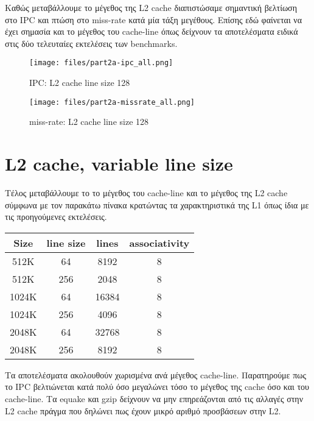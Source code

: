 \documentclass[a4paper,12pt]{article}
\begin{document}
Καθώς μεταβάλλουμε το μέγεθος της L2 cache διαπιστώσαμε σημαντική βελτίωση στο
IPC και πτώση στο miss-rate κατά μία τάξη μεγέθους. Επίσης εδώ φαίνεται να
έχει σημασία και το μέγεθος του cache-line όπως δείχνουν τα αποτελέσματα
ειδικά στις δύο τελευταίες εκτελέσεις των benchmarks.

\begin{figure}[H]
    \centering
    \texttt{[image: files/part2a-ipc\_all.png]}
    \caption{IPC: L2 cache line size 128}
\end{figure}

\begin{figure}[H]
    \centering
    \texttt{[image: files/part2a-missrate\_all.png]}
    \caption{miss-rate: L2 cache line size 128}
\end{figure}


\pagebreak



\section{L2 cache, variable line size}

Τέλος μεταβάλλουμε το το μέγεθος του cache-line και το μέγεθος της L2 cache
σύμφωνα με τον παρακάτω πίνακα κρατώντας τα χαρακτηριστικά της L1 όπως ίδια με
τις προηγούμενες εκτελέσεις.

\begin{table}[H]
    \centering
    \begin{tabular}{c c c c}
        Size & line size & lines & associativity\\ 
        \hline
        \hline
        512K   & 64  & 8192  & 8\\
        512K   & 256 & 2048  & 8\\
        \hline
        1024K  & 64  & 16384 & 8\\
        1024K  & 256 & 4096  & 8\\
        \hline
        2048K  & 64  & 32768 & 8\\
        2048K  & 256 & 8192  & 8\\
    \end{tabular}
\end{table}

Τα αποτελέσματα ακολουθούν χωρισμένα ανά μέγεθος cache-line. Παρατηρούμε πως
το IPC βελτιώνεται κατά πολύ όσο μεγαλώνει τόσο το μέγεθος της cache όσο και
του cache-line. Τα equake και gzip δείχνουν να μην επηρεάζονται από τις
αλλαγές στην L2 cache πράγμα που δηλώνει πως έχουν μικρό αριθμό προσβάσεων
στην L2.
\end{document}
